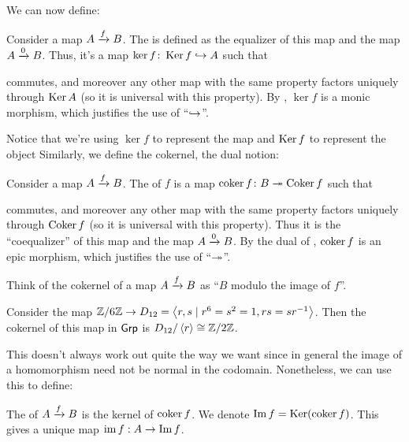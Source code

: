 We can now define:
\begin{definition}
	Consider a map $A \xrightarrow{f} B$.
	The  is defined as the equalizer of this map and the map $A \xrightarrow{0} B$.
	Thus, it's a map $\ker f \colon \operatorname{Ker} f \hookrightarrow A$ such that
	\begin{center}
	\end{center}
	commutes, and moreover any other map with the same property factors uniquely through $\operatorname{Ker} A$
	(so it is universal with this property).
	By , $\ker f$ is a monic morphism,
	which justifies the use of ``$\hookrightarrow$''.
\end{definition}
Notice that we're using $\ker f$ to represent the map and $\operatorname{Ker} f$ to represent the object
Similarly, we define the cokernel, the dual notion:
\begin{definition}
	Consider a map $A \xrightarrow{f} B$.
	The  of $f$ is a map $\operatorname{coker} f \colon B \twoheadrightarrow \operatorname{Coker} f$ such that
	\begin{center}
	\end{center}
	commutes, and moreover any other map with the same property factors
	uniquely through $\operatorname{Coker} f$ (so it is universal with this property).
	Thus it is the ``coequalizer'' of this map and the map $A \xrightarrow{0} B$.
	By the dual of , $\operatorname{coker} f$ is an epic morphism,
	which justifies the use of ``$\twoheadrightarrow$''.
\end{definition}
Think of the cokernel of a map $A \xrightarrow{f} B$ as ``$B$ modulo the image of $f$''.
\begin{example}
	[Cokernels]
	Consider the map $\mathbb Z/6\mathbb Z \to D_{12} = \left\langle r,s \mid r^6=s^2=1, rs=sr^{-1}\right\rangle$.
	Then the cokernel of this map in $\mathsf{Grp}$ is $D_{12} / \left\langle r \right\rangle \cong \mathbb Z/2\mathbb Z$.
\end{example}
This doesn't always work out quite the way we want since in general the image of
a homomorphism need not be normal in the codomain.
Nonetheless, we can use this to define:
\begin{definition}
	The  of $A \xrightarrow{f} B$ is the kernel of $\operatorname{coker} f$.
	We denote $\operatorname{Im} f = \operatorname{Ker}(\operatorname{coker} f)$.
	This gives a unique map $\operatorname{im} f : A \to \operatorname{Im} f$.
\end{definition}

